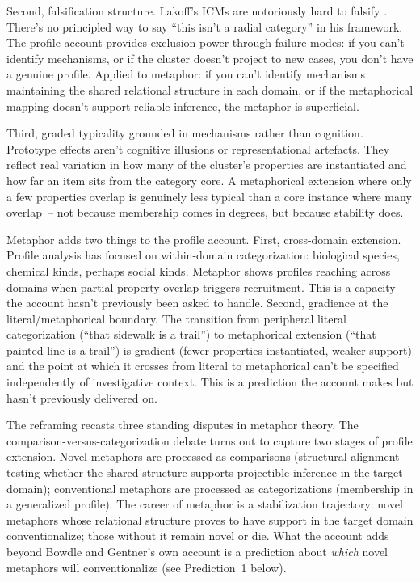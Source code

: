\documentclass[12pt]{article}
\begin{document}
Second, falsification structure. Lakoff's ICMs are notoriously hard to falsify \citep{glynn2010}. There's no principled way to say \enquote{this isn't a radial category} in his framework. The profile account provides exclusion power through failure modes: if you can't identify mechanisms, or if the cluster doesn't project to new cases, you don't have a genuine profile. Applied to metaphor: if you can't identify mechanisms maintaining the shared relational structure in each domain, or if the metaphorical mapping doesn't support reliable inference, the metaphor is superficial.

Third, graded typicality grounded in mechanisms rather than cognition. Prototype effects aren't cognitive illusions or representational artefacts. They reflect real variation in how many of the cluster's properties are instantiated and how far an item sits from the category core. A metaphorical extension where only a few properties overlap is genuinely less typical than a core instance where many overlap~-- not because membership comes in degrees, but because stability does.

Metaphor adds two things to the profile account. First, cross-domain extension. Profile analysis has focused on within-domain categorization: biological species, chemical kinds, perhaps social kinds. Metaphor shows profiles reaching across domains when partial property overlap triggers recruitment. This is a capacity the account hasn't previously been asked to handle. Second, gradience at the literal/metaphorical boundary. The transition from peripheral literal categorization (\enquote{that sidewalk is a trail}) to metaphorical extension (\enquote{that painted line is a trail}) is gradient (fewer properties instantiated, weaker support) and the point at which it crosses from literal to metaphorical can't be specified independently of investigative context. This is a prediction the account makes but hasn't previously delivered on.

The reframing recasts three standing disputes in metaphor theory. The comparison-versus-categorization debate \citep{gentner1983, glucksberg2001} turns out to capture two stages of profile extension. Novel metaphors are processed as comparisons (structural alignment testing whether the shared structure supports projectible inference in the target domain); conventional metaphors are processed as categorizations (membership in a generalized profile). The career of metaphor \citep{bowdle2005} is a stabilization trajectory: novel metaphors whose relational structure proves to have support in the target domain conventionalize; those without it remain novel or die. What the account adds beyond Bowdle and Gentner's own account is a prediction about \emph{which} novel metaphors will conventionalize (see Prediction~1 below).
\end{document}
